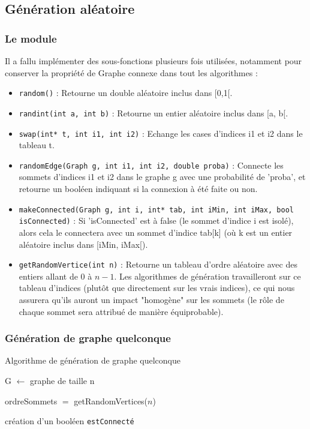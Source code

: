 \documentclass[a4paper,10pt]{article}
\newcommand*{\itemb}{\item[$\bullet$]}
\begin{document}
\subsection{Génération aléatoire}

\subsubsection{Le module}

Il a fallu implémenter des sous-fonctions plusieurs fois utilisées, notamment pour conserver la propriété de Graphe connexe dans tout les algorithmes :
\BlankLine
\begin{itemize}
	\itemb \texttt{random()} : Retourne un double aléatoire inclus dans [0,1[.
	\itemb \texttt{randint(int a, int b)} : Retourne un entier aléatoire inclus dans [a, b[.
	\itemb \texttt{swap(int* t, int i1, int i2)} : Echange les cases d'indices i1 et i2 dans le tableau t.
	\itemb \texttt{randomEdge(Graph g, int i1, int i2, double proba)} : Connecte les sommets d'indices i1 et i2 dans le graphe g avec une probabilité de 'proba', et retourne un booléen indiquant si la connexion à été faite ou non.
	\itemb \texttt{makeConnected(Graph g, int i, int* tab, int iMin, int iMax, bool isConnected)} : Si 'isConnected' est à false (le sommet d'indice i est isolé), alors cela le connectera avec un sommet d'indice tab[k] (où k est un entier aléatoire inclus dans [iMin, iMax[).
	\itemb \texttt{getRandomVertice(int n)} : Retourne un tableau d'ordre aléatoire avec des entiers allant de $0$ à $n-1$. Les algorithmes de génération travailleront sur ce tableau d'indices (plutôt que directement sur les vrais indices), ce qui nous assurera qu'ils auront un impact "homogène" sur les sommets (le rôle de chaque sommet sera attribué de manière équiprobable).
\end{itemize}

\subsubsection{Génération de graphe quelconque}

\begin{algorithm}[H]
\caption{Algorithme de génération de graphe quelconque}
\BlankLine
G $\leftarrow$ graphe de taille n

ordreSommets $=$ getRandomVertices($n$)

création d'un booléen \texttt{estConnecté}



\end{algorithm}
\bigskip
\end{document}
